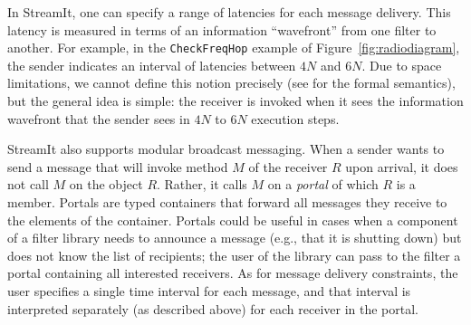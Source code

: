In StreamIt, one can specify a range of latencies for each message
delivery.  This latency is measured in terms of an information
``wavefront'' from one filter to another.  For example, in the
\texttt{CheckFreqHop} example of Figure~\ref{fig:radiodiagram}, the
sender indicates an interval of  latencies between $4N$ and $6N$.  Due
to  space limitations,  we cannot  define this  notion  precisely (see
\cite{streamittech620,streamittech622} for  the formal semantics), but
the general idea  is simple: the receiver is invoked  when it sees the
information wavefront that  the sender sees in $4N$  to $6N$ execution
steps.


%

StreamIt also supports
modular broadcast messaging.  When a sender wants to send a message
that will invoke method $M$ of the receiver $R$ upon arrival, it does
not call $M$ on the object $R$.  Rather, it calls $M$ on a
\emph{portal} of which $R$ is a member.  Portals are typed containers
that forward all messages they receive to the elements of the
container.  Portals could be useful in cases when a component of a
filter library needs to announce a message (e.g., that it is shutting
down) but does not know the list of recipients; the user of the
library can pass to the filter a portal containing all interested
receivers.  As for message delivery constraints, the user specifies a
single time interval for each message, and that interval is
interpreted separately (as described above) for each receiver in the
portal.

